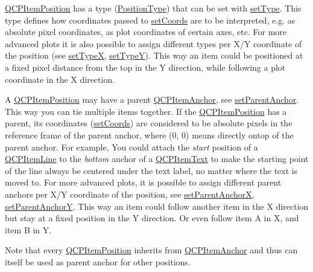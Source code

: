 \hyperlink{class_q_c_p_item_position}{Q\+C\+P\+Item\+Position} has a type (\hyperlink{class_q_c_p_item_position_aad9936c22bf43e3d358552f6e86dbdc8}{Position\+Type}) that can be set with \hyperlink{class_q_c_p_item_position_aa476abf71ed8fa4c537457ebb1a754ad}{set\+Type}. This type defines how coordinates passed to \hyperlink{class_q_c_p_item_position_aa988ba4e87ab684c9021017dcaba945f}{set\+Coords} are to be interpreted, e.\+g. as absolute pixel coordinates, as plot coordinates of certain axes, etc. For more advanced plots it is also possible to assign different types per X/Y coordinate of the position (see \hyperlink{class_q_c_p_item_position_a2113b2351d6d00457fb3559a4e20c3ea}{set\+TypeX}, \hyperlink{class_q_c_p_item_position_ac2a454aa5a54c1615c50686601ec4510}{set\+TypeY}). This way an item could be positioned at a fixed pixel distance from the top in the Y direction, while following a plot coordinate in the X direction.

A \hyperlink{class_q_c_p_item_position}{Q\+C\+P\+Item\+Position} may have a parent \hyperlink{class_q_c_p_item_anchor}{Q\+C\+P\+Item\+Anchor}, see \hyperlink{class_q_c_p_item_position_ac094d67a95d2dceafa0d50b9db3a7e51}{set\+Parent\+Anchor}. This way you can tie multiple items together. If the \hyperlink{class_q_c_p_item_position}{Q\+C\+P\+Item\+Position} has a parent, its coordinates (\hyperlink{class_q_c_p_item_position_aa988ba4e87ab684c9021017dcaba945f}{set\+Coords}) are considered to be absolute pixels in the reference frame of the parent anchor, where (0, 0) means directly ontop of the parent anchor. For example, You could attach the {\itshape start} position of a \hyperlink{class_q_c_p_item_line}{Q\+C\+P\+Item\+Line} to the {\itshape bottom} anchor of a \hyperlink{class_q_c_p_item_text}{Q\+C\+P\+Item\+Text} to make the starting point of the line always be centered under the text label, no matter where the text is moved to. For more advanced plots, it is possible to assign different parent anchors per X/Y coordinate of the position, see \hyperlink{class_q_c_p_item_position_add71461a973927c74e42179480916d9c}{set\+Parent\+AnchorX}, \hyperlink{class_q_c_p_item_position_add5ec1db9d19cec58a3b5c9e0a0c3f9d}{set\+Parent\+AnchorY}. This way an item could follow another item in the X direction but stay at a fixed position in the Y direction. Or even follow item A in X, and item B in Y.

Note that every \hyperlink{class_q_c_p_item_position}{Q\+C\+P\+Item\+Position} inherits from \hyperlink{class_q_c_p_item_anchor}{Q\+C\+P\+Item\+Anchor} and thus can itself be used as parent anchor for other positions.

